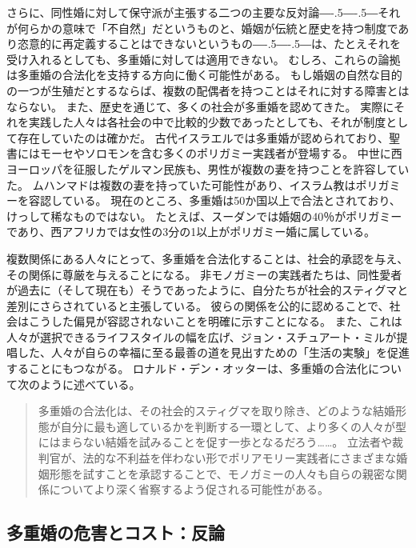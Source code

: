 \documentclass[paper=a4,book,openany]{jlreq}
\def\DDASH{―\kern-.5\zw―\kern-.5\zw―}
\begin{document}
さらに、同性婚に対して保守派が主張する二つの主要な反対論{\DDASH}それが何らかの意味で「不自然」だというものと、婚姻が伝統と歴史を持つ制度であり恣意的に再定義することはできないというもの{\DDASH}は、たとえそれを受け入れるとしても、多重婚に対しては適用できない。
むしろ、これらの論拠は多重婚の合法化を支持する方向に働く可能性がある。
もし婚姻の自然な目的の一つが生殖だとするならば、複数の配偶者を持つことはそれに対する障害とはならない。
また、歴史を通じて、多くの社会が多重婚を認めてきた。
実際にそれを実践した人々は各社会の中で比較的少数であったとしても、それが制度として存在していたのは確かだ。
古代イスラエルでは多重婚が認められており、聖書にはモーセやソロモンを含む多くのポリガミー実践者が登場する。
中世に西ヨーロッパを征服したゲルマン民族も、男性が複数の妻を持つことを許容していた。
ムハンマドは複数の妻を持っていた可能性があり、イスラム教はポリガミーを容認している。
現在のところ、多重婚は50か国以上で合法とされており、けっして稀なものではない。
たとえば、スーダンでは婚姻の40％がポリガミーであり、西アフリカでは女性の3分の1以上がポリガミー婚に属している\citep{economist17:_link_between_polyg_war,dalton14:_why_is_polyg_more_preval_wester_afric}。

複数関係にある人々にとって、多重婚を合法化することは、社会的承認を与え、その関係に尊厳を与えることになる。
非モノガミーの実践者たちは、同性愛者が過去に（そして現在も）そうであったように、自分たちが社会的スティグマと差別にさらされていると主張している。
彼らの関係を公的に認めることで、社会はこうした偏見が容認されないことを明確に示すことになる。
また、これは人々が選択できるライフスタイルの幅を広げ、ジョン・スチュアート・ミルが提唱した、人々が自らの幸福に至る最善の道を見出すための「生活の実験」を促進することにもつながる\citep[p.57]{mill89:_liber_other_writin}。
ロナルド・デン・オッターは、多重婚の合法化について次のように述べている。

\begin{quote}
多重婚の合法化は、その社会的スティグマを取り除き、どのような結婚形態が自分に最も適しているかを判断する一環として、より多くの人々が型にはまらない結婚を試みることを促す一歩となるだろう……。
立法者や裁判官が、法的な不利益を伴わない形でポリアモリー実践者にさまざまな婚姻形態を試すことを承認することで、モノガミーの人々も自らの親密な関係についてより深く省察するよう促される可能性がある。
\citep{otter18:_perfec_argum_legal_recog_polyam_relat}
\end{quote}

\subsection{多重婚の危害とコスト：反論}
\end{document}
